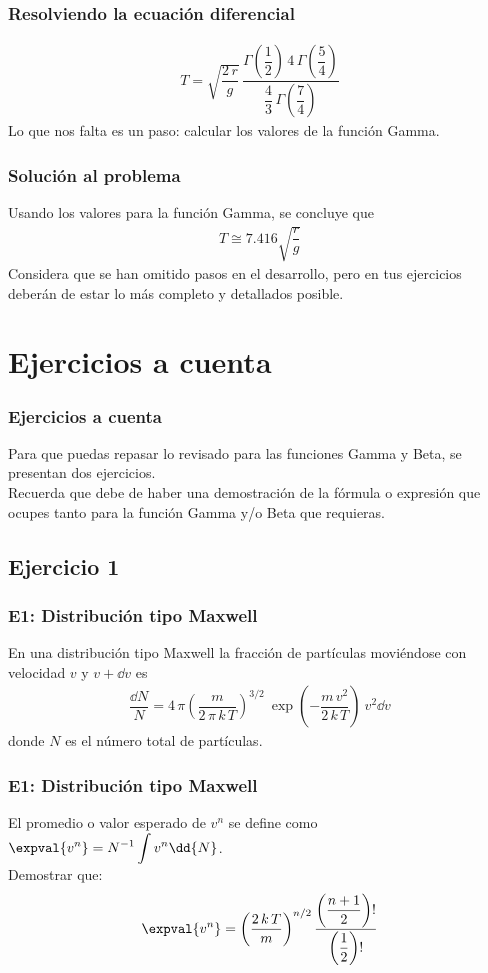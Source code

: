 \begin{frame}
\frametitle{Resolviendo la ecuación diferencial}
\begin{align*}
T = \sqrt{\dfrac{2 \, r}{g}} \, \dfrac{\Gamma \left(\dfrac{1}{2} \right) \, 4 \, \Gamma \left(\dfrac{5}{4} \right)}{\dfrac{4}{3} \, \Gamma \left(\dfrac{7}{4} \right)}
\end{align*}
Lo que nos falta es un paso: calcular los valores de la función Gamma.
\end{frame}
\begin{frame}
\frametitle{Solución al problema}
Usando los valores para la función Gamma, se concluye que
\begin{align*}
T \cong 7.416 \sqrt{\dfrac{r}{g}}
\end{align*}
\pause
\fontsize{12}{12}\selectfont
Considera que se han omitido pasos en el desarrollo, pero en tus ejercicios deberán de estar lo más completo y detallados posible.
\end{frame}
\section{Ejercicios a cuenta}
\begin{frame}
\frametitle{Ejercicios a cuenta}
Para que puedas repasar lo revisado para las funciones Gamma y Beta, se presentan dos ejercicios.
\\
\bigskip
Recuerda que debe de haber una demostración de la fórmula o expresión que ocupes tanto para la función Gamma y/o Beta que requieras.
\end{frame}   
\subsection{Ejercicio 1}
\begin{frame}
\frametitle{E1: Distribución tipo Maxwell}
En una distribución tipo Maxwell la fracción de partículas moviéndose con velocidad $v$ y $v +\dd{v}$ es
\begin{align*}
\dfrac{\dd{N}}{N} = 4 \, \pi \left( \dfrac{m}{2 \, \pi \, k \, T} \right)^{3/2} \: \exp \left( - \dfrac{m \, v^{2}}{2 \, k \, T} \right) \: v^{2} \dd{v}
\end{align*}
donde $N$ es el número total de partículas. 
\end{frame}
\begin{frame}
\frametitle{E1: Distribución tipo Maxwell}
El promedio o valor esperado de $v^{n}$ se define como $\displaystyle \expval{v^{n}} = N^{-1} \int v^{n} \dd{N}$.
\\
\bigskip
\pause
Demostrar que:
\begin{align*}
\expval{v^{n}} = \left( \dfrac{2 \, k \, T}{m} \right)^{n/2} \dfrac{\left( \dfrac{n + 1}{2} \right) !} { \left( \dfrac{1}{2} \right) !}
\end{align*}
\end{frame}

